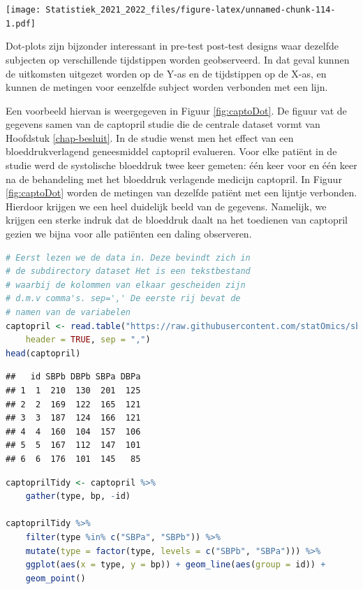 \documentclass[
  12pt,dutch,coursenotes]{book}
\theoremstyle{definition}
\theoremstyle{definition}
\theoremstyle{definition}
\theoremstyle{definition}
\theoremstyle{remark}
\begin{document}
\texttt{[image: Statistiek\_2021\_2022\_files/figure-latex/unnamed-chunk-114-1.pdf]}

Dot-plots zijn bijzonder interessant in pre-test post-test designs waar dezelfde subjecten op
verschillende tijdstippen worden geobserveerd. In dat geval kunnen de uitkomsten
uitgezet worden op de Y-as en de tijdstippen op de X-as, en kunnen de
metingen voor eenzelfde subject worden verbonden met een lijn.

Een
voorbeeld hiervan is weergegeven in Figuur \ref{fig:captoDot}. De figuur vat de gegevens samen van de captopril studie die de centrale dataset vormt van Hoofdstuk \ref{chap-besluit}. In de studie wenst men het effect van een bloeddrukverlagend geneesmiddel captopril evalueren. Voor elke patiënt in de studie werd de systolische bloeddruk twee keer gemeten: één keer voor en één keer na de behandeling met het bloeddruk verlagende medicijn captopril. In Figuur \ref{fig:captoDot} worden de metingen van dezelfde patiënt met een lijntje verbonden. Hierdoor krijgen we een heel duidelijk beeld van de gegevens. Namelijk, we krijgen een sterke indruk dat de bloeddruk daalt na het toedienen van captopril gezien we bijna voor alle patiënten een daling observeren.

\begin{lstlisting}[language=R]
# Eerst lezen we de data in. Deze bevindt zich in
# de subdirectory dataset Het is een tekstbestand
# waarbij de kolommen van elkaar gescheiden zijn
# d.m.v comma's. sep=',' De eerste rij bevat de
# namen van de variabelen
captopril <- read.table("https://raw.githubusercontent.com/statOmics/sbc21/master/data/captopril.txt",
    header = TRUE, sep = ",")
head(captopril)
\end{lstlisting}

\begin{lstlisting}
##   id SBPb DBPb SBPa DBPa
## 1  1  210  130  201  125
## 2  2  169  122  165  121
## 3  3  187  124  166  121
## 4  4  160  104  157  106
## 5  5  167  112  147  101
## 6  6  176  101  145   85
\end{lstlisting}

\begin{lstlisting}[language=R]
captoprilTidy <- captopril %>%
    gather(type, bp, -id)

captoprilTidy %>%
    filter(type %in% c("SBPa", "SBPb")) %>%
    mutate(type = factor(type, levels = c("SBPb", "SBPa"))) %>%
    ggplot(aes(x = type, y = bp)) + geom_line(aes(group = id)) +
    geom_point()
\end{lstlisting}
\end{document}
